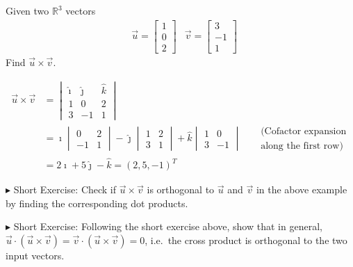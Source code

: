 \begin{exmp}
Given two $\mathbb{R}^3$ vectors
\begin{align*}
&\vec{u} =
\begin{bmatrix}
1 \\
0 \\
2
\end{bmatrix}
&\vec{v} =
\begin{bmatrix}
3 \\
-1 \\
1
\end{bmatrix}
\end{align*}
Find $\vec{u} \times \vec{v}$.
\end{exmp}
\begin{solution}
\begin{align*}
\vec{u} \times \vec{v} &=
\begin{vmatrix}
\hat{\imath} & \hat{\jmath} & \hat{k} \\
1 & 0 & 2 \\
3 & -1 & 1
\end{vmatrix} \\
&= 
\hat{\imath}
\begin{vmatrix}
0 & 2 \\
-1 & 1 
\end{vmatrix}
- \hat{\jmath}
\begin{vmatrix}
1 & 2 \\
3 & 1 
\end{vmatrix}
+ \hat{k}
\begin{vmatrix}
1 & 0 \\
3 & -1 
\end{vmatrix}
& \begin{aligned}
&\text{(Cofactor expansion} \\ 
&\text{along the first row)}
\end{aligned}\\
&= 2\hat{\imath} + 5\hat{\jmath} - \hat{k} = (2,5,-1)^T
\end{align*} 
\end{solution}
$\blacktriangleright$ Short Exercise: Check if $\vec{u} \times \vec{v}$ is orthogonal to $\vec{u}$ and $\vec{v}$ in the above example by finding the corresponding dot products.\footnotemark\par
$\blacktriangleright$ Short Exercise: Following the short exercise above, show that in general, $\vec{u} \cdot (\vec{u} \times \vec{v}) = \vec{v} \cdot (\vec{u} \times \vec{v}) = 0$, i.e.\ the cross product is orthogonal to the two input vectors.\footnotemark

